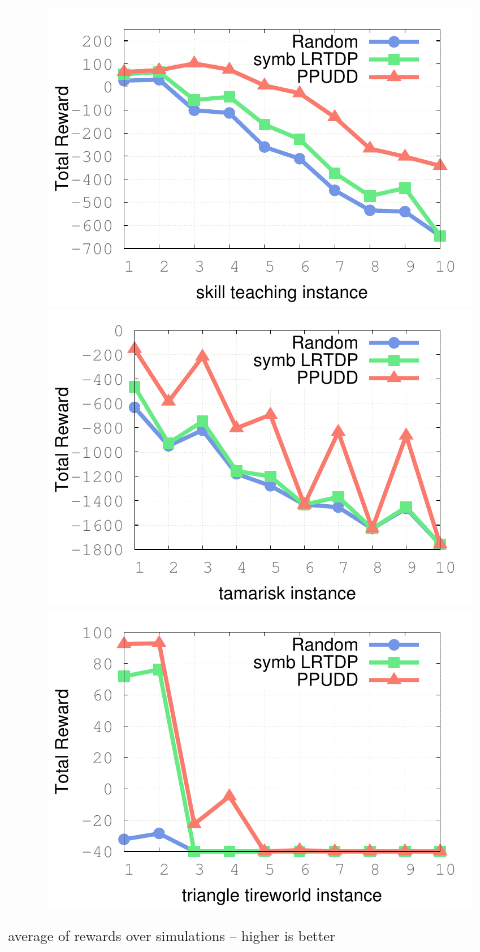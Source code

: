 \documentclass[12pt,svgnames,table]{beamer}
\begin{document}
\begin{frame}
\begin{figure}
\vspace{0.5cm}
\includegraphics[scale=0.3]{IPPC2014_results/skill_teaching.pdf} 
\includegraphics[scale=0.3]{IPPC2014_results/tamarisk.pdf}
\includegraphics[scale=0.3]{IPPC2014_results/triangle_tireworld.pdf} 
\end{figure}
{\color{orange} average of rewards over simulations} \hspace{0.2cm} -- \hspace{0.2cm} {\color{gggreen} higher is better }
\end{frame}
\end{document}
